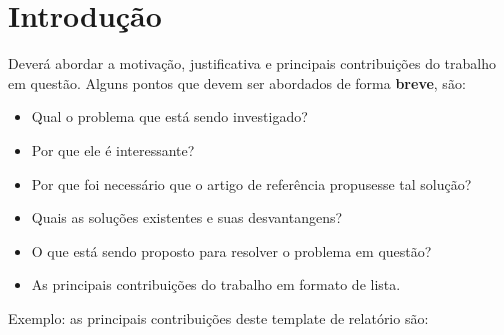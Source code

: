 \documentclass[conference]{IEEEtran}
\begin{document}




\maketitle

\begin{abstract}
Breve apresentação do contexto do trabalho, problema a ser abordado, soluções existentes, método proposto e resultados obtidos.
\end{abstract}





%
\IEEEpeerreviewmaketitle

\section{Introdução}

Deverá abordar a motivação, justificativa e principais contribuições do trabalho em questão. Alguns pontos que devem ser abordados de forma \textbf{breve}, são:

\begin{itemize}
    \item Qual o problema que está sendo investigado?
    \item Por que ele é interessante?
    \item Por que foi necessário que o artigo de referência propusesse tal solução?
    \item Quais as soluções existentes e suas desvantangens?
    \item O que está sendo proposto para resolver o problema em questão?
    \item As principais contribuições do trabalho em formato de lista.
\end{itemize}

Exemplo: as principais contribuições deste template de relatório são:
\end{document}
